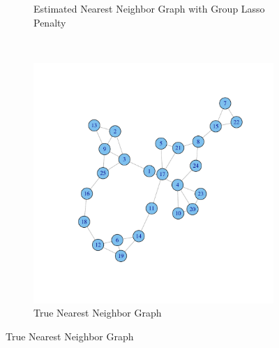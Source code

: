 \documentclass[t]{beamer}
\begin{document}
\begin{frame}
\begin{figure}
\begin{subfigure}[b]{0.40\textwidth}
  \caption{Estimated Nearest Neighbor Graph with Group Lasso Penalty}
\label{fig:nearestgaphsestimate}
\end{subfigure}\\
\begin{subfigure}[b]{0.50\textwidth}
  \includegraphics [scale=0.15]{Omega1-f.pdf}
  \caption{True Nearest Neighbor Graph}
\label{fig:nearestgaphsactual}
\end{subfigure}
\end{figure}
\end{frame}
\end{document}
